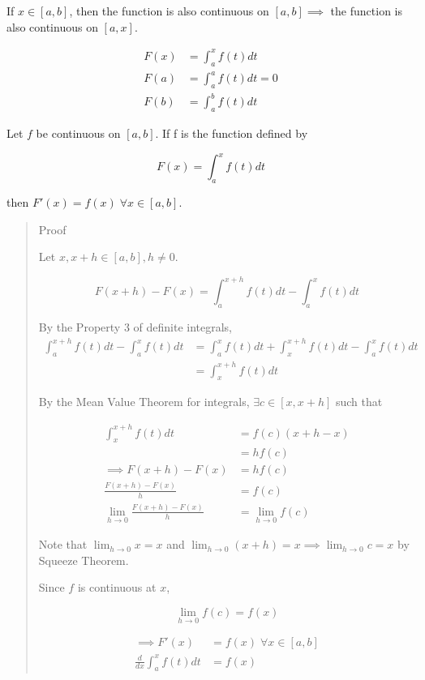 \documentclass[
]{article}
\begin{document}
If \(x \in [a,b]\), then the function is also continuous on
\([a,b] \implies\) the function is also continuous on \([a,x]\).

\begin{align*}
F(x) &= \int_a^x f(t)dt \\
F(a) &= \int_a^a f(t)dt = 0 \\
F(b) &= \int_a^b f(t)dt
\end{align*}

Let \(f\) be continuous on \([a,b]\). If f is the function defined by

\[ F(x) = \int_a^x f(t)dt \]

then \(F'(x) = f(x) \;\forall x \in [a,b]\).

\begin{quote}
Proof

Let \(x, x+h \in [a,b], h\neq 0\).

\[ F(x+h)-F(x) = \int_a^{x+h} f(t)dt -\int_a^x f(t)dt \]

By the Property 3 of definite integrals, \begin{align*}
\int_a^{x+h} f(t)dt -\int_a^x f(t)dt &= \int_a^x f(t)dt + \int_x^{x+h}f(t)dt -\int_a^x f(t)dt\\
&= \int_x^{x+h}f(t)dt
\end{align*}

By the Mean Value Theorem for integrals, \(\exists c \in [x,x+h]\) such
that

\begin{align*}
\int_x^{x+h}f(t)dt &= f(c)(x+h-x)\\
&=hf(c)\\
\implies F(x+h)-F(x) &= hf(c)\\
\frac{F(x+h)-F(x)}{h} &= f(c)\\
\lim_{h\to 0}\frac{F(x+h)-F(x)}{h} &= \lim_{h\to 0}f(c)
\end{align*}

Note that \(\displaystyle \lim_{h\to 0}x = x\) and
\(\displaystyle \lim_{h\to 0}(x+h) = x \implies \lim_{h\to 0}c = x\) by
Squeeze Theorem.

Since \(f\) is continuous at \(x\),

\[ \lim_{h\to 0}f(c) = f(x) \]

\begin{align*}
\implies F'(x) &= f(x) \;\forall x \in [a,b]\\
\frac{d}{dx}\int_a^x f(t)dt &= f(x)
\end{align*}
\end{quote}
\end{document}
